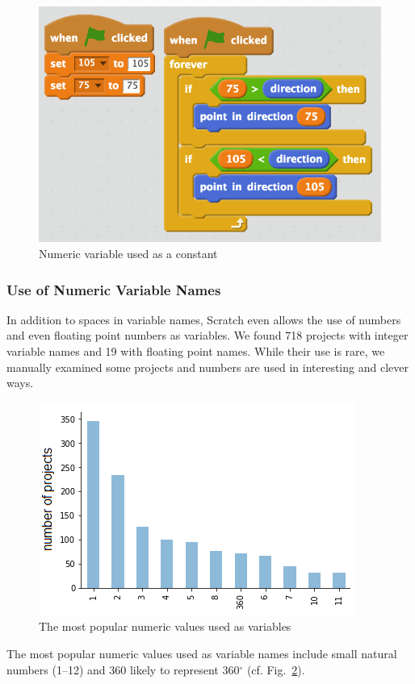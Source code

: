 \documentclass[conference]{IEEEtran}
\begin{document}
\begin{figure}[h]
	\begin{center}
		\includegraphics[scale=0.46]{fig/constants}
		\caption{Numeric variable used as a constant}
		\label{fig:constants}
	\end{center}
\end{figure} 	

\subsubsection{Use of Numeric Variable Names}
In addition to spaces in variable names, Scratch even allows the use of numbers and even floating point numbers as variables. We found 718 projects with integer variable names and 19 with floating point names. While their use is rare, we manually examined some projects and numbers are used in interesting and clever ways. 
\begin{figure}[h]
	\begin{center}
		\includegraphics[scale=0.6]{fig/project/numeric}
		\caption{The most popular numeric values used as variables}
		\label{fig:numeric}
	\end{center}
\end{figure} 
The most popular numeric values used as variable names include small natural numbers (1--12) and 360 likely to represent 360$^\circ$ (cf. Fig.~\ref{fig:numeric}).
\end{document}
